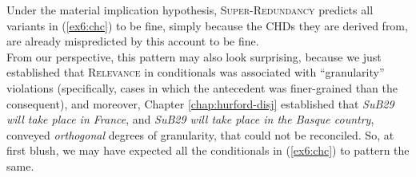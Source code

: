 \begin{exe}
	\ex
	\begin{xlist}
		\label{ex6:chc-nftbnf}
		\label{ex6:chc-ftnbf}
	\end{xlist}
\end{exe}

Under the material implication hypothesis, \textsc{Super-Redundancy} predicts all variants in (\ref{ex6:chc}) to be fine, simply because the CHDs they are derived from, are already mispredicted by this account to be fine.\\


From our perspective, this pattern may also look surprising, because we just established that \textsc{Relevance} in conditionals was associated with ``granularity'' violations (specifically, cases in which the antecedent was finer-grained than the consequent), and moreover, Chapter \ref{chap:hurford-disj} established that \textit{SuB29 will take place in France}, and \textit{SuB29 will take place in the Basque country}, conveyed \textit{orthogonal} degrees of granularity, that could not be reconciled. So, at first blush, we may have expected all the conditionals in (\ref{ex6:chc}) to pattern the same.\\

